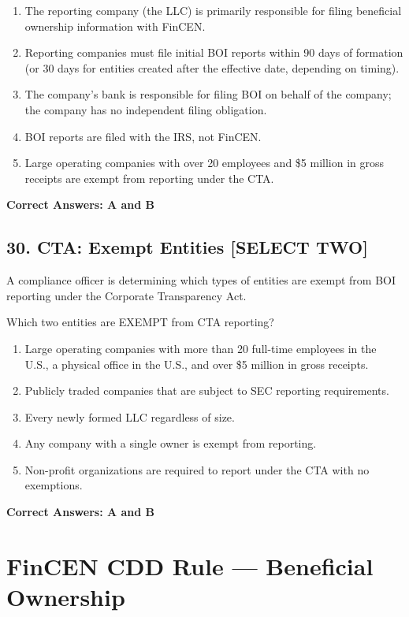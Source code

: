 \documentclass[11pt,a4paper]{article}
\begin{document}
	\begin{enumerate}[label=\Alph*.]
		\item The reporting company (the LLC) is primarily responsible for filing beneficial ownership information with FinCEN.
		\item Reporting companies must file initial BOI reports within 90 days of formation (or 30 days for entities created after the effective date, depending on timing).
		\item The company's bank is responsible for filing BOI on behalf of the company; the company has no independent filing obligation.
		\item BOI reports are filed with the IRS, not FinCEN.
		\item Large operating companies with over 20 employees and \$5 million in gross receipts are exempt from reporting under the CTA.
	\end{enumerate}
	
	\textbf{Correct Answers: A and B}
	
	\subsection{30. CTA: Exempt Entities \textnormal{[SELECT TWO]}}
	
	A compliance officer is determining which types of entities are exempt from BOI reporting under the Corporate Transparency Act.
	
	Which two entities are EXEMPT from CTA reporting?
	
	\begin{enumerate}[label=\Alph*.]
		\item Large operating companies with more than 20 full-time employees in the U.S., a physical office in the U.S., and over \$5 million in gross receipts.
		\item Publicly traded companies that are subject to SEC reporting requirements.
		\item Every newly formed LLC regardless of size.
		\item Any company with a single owner is exempt from reporting.
		\item Non-profit organizations are required to report under the CTA with no exemptions.
	\end{enumerate}
	
	\textbf{Correct Answers: A and B}
	
	\section{FinCEN CDD Rule — Beneficial Ownership}
	
\end{document}
